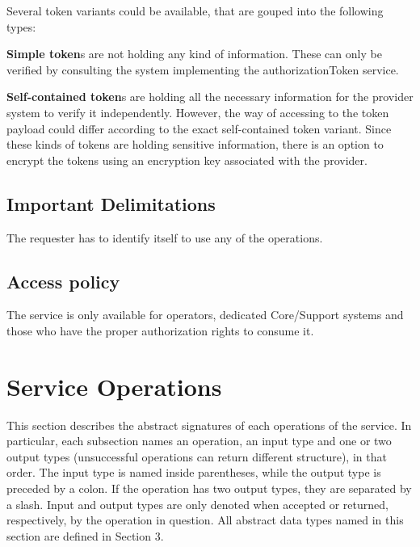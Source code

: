 \documentclass[a4paper]{arrowhead}
\begin{document}
Several token variants could be available, that are gouped into the following types:

\textbf{Simple token}s are not holding any kind of information. These can only be verified by consulting the system implementing the authorizationToken service.

\textbf{Self-contained token}s are holding all the necessary information for the provider system to verify it independently. However, the way of accessing to the token payload could differ according to the exact self-contained token variant. Since these kinds of tokens are holding sensitive information, there is an option to encrypt the tokens using an encryption key associated with the provider.

\subsection{Important Delimitations}
\label{sec:delimitations}

The requester has to identify itself to use any of the operations.

\subsection{Access policy}
\label{sec:accesspolicy}

The service is only available for operators, dedicated Core/Support systems and those who have the proper
authorization rights to consume it.

\newpage

\section{Service Operations}
\label{sec:functions}

This section describes the abstract signatures of each operations of the service. In particular, each subsection names an operation, an input type and one or two output types (unsuccessful operations can return different structure), in that order.
The input type is named inside parentheses, while the output type is preceded by a colon. If the operation has two output types, they are separated by a slash.
Input and output types are only denoted when accepted or returned, respectively, by the operation in question. All abstract data types named in this section are defined in Section 3.

{}
\end{document}
